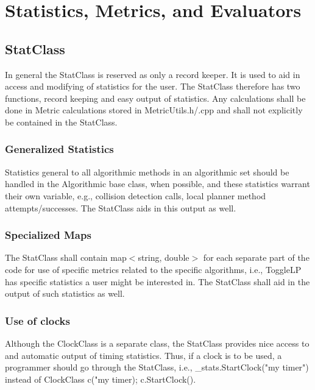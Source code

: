 \documentclass[12pt]{article}
\begin{document}

\section{Statistics, Metrics, and Evaluators}

\subsection{StatClass}
In general the StatClass is reserved as only a record keeper. It is used to aid in access and modifying of statistics
for the user. The StatClass therefore has two functions, record keeping and easy output of statistics. Any calculations
shall be done in Metric calculations stored in MetricUtils.h/.cpp and shall not explicitly be contained in the
StatClass.

\subsubsection{Generalized Statistics}
Statistics general to all algorithmic methods in an algorithmic set should be handled in the Algorithmic base class,
when possible, and these statistics warrant their own variable, e.g., collision detection calls, local planner method
attempts/successes. The StatClass aids in this output as well.

\subsubsection{Specialized Maps}
The StatClass shall contain map$<$string, double$>$ for each separate part of the code for use of specific metrics related
to the specific algorithms, i.e., ToggleLP has specific statistics a user might be interested in. The StatClass shall
aid in the output of such statistics as well.

\subsubsection{Use of clocks}
Although the ClockClass is a separate class, the StatClass provides nice access to and automatic output of timing
statistics. Thus, if a clock is to be used, a programmer should go through the StatClass, i.e., \_stats.StartClock("my
timer") instead of ClockClass c("my timer); c.StartClock(). 
\end{document}
